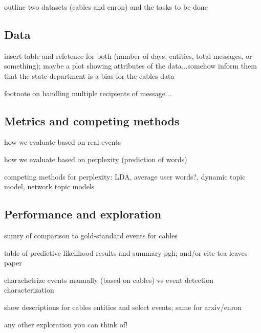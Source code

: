 \PP outline two datasets (cables and enron) and the tasks to be done

\subsection{Data}




\PP insert table and refetence for both (number of days, entities, total messages, or something); maybe a plot showing attributes of the data...somehow inform them that the state department is a bias for the cables data

\PP footnote on handling multiple recipients of message...

\subsection{Metrics and competing methods}

\PP how we evaluate based on real events

\PP how we evaluate based on perplexity (prediction of words)

\PP competing methods for perplexity: LDA, average user words?, dynamic topic model, network topic models

\subsection{Performance and exploration}

\PP sumry of comparison to gold-standard events for cables

\PP table of predictive likelihood results and summary pgh; and/or cite tea leaves paper


\PP charachetrize events manually (based on cables) vs event detection characterization

\PP show descriptions for cables entities and select events; same for arxiv/enron

\PP any other exploration you can think of!